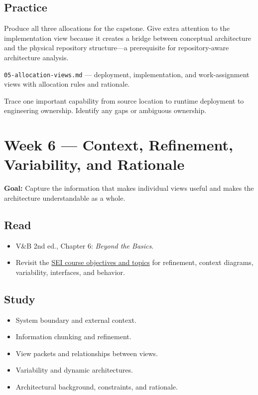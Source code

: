 \documentclass[10pt,letterpaper]{article}
\begin{document}
\subsection{Practice}
Produce all three allocations for the capstone. Give extra attention to the implementation view because it creates a bridge between conceptual architecture and the physical repository structure---a prerequisite for repository-aware architecture analysis.

\begin{deliverablebox}
\texttt{05-allocation-views.md} --- deployment, implementation, and work-assignment views with allocation rules and rationale.
\end{deliverablebox}

\begin{masterybox}
Trace one important capability from source location to runtime deployment to engineering ownership. Identify any gaps or ambiguous ownership.
\end{masterybox}

\section{Week 6 --- Context, Refinement, Variability, and Rationale}

\textbf{Goal:} Capture the information that makes individual views useful and makes the architecture understandable as a whole.

\subsection{Read}
\begin{itemize}
  \item V\&B 2nd ed., Chapter 6: \emph{Beyond the Basics}.
  \item Revisit the \href{https://www.sei.cmu.edu/training/documenting-software-architectures/}{SEI course objectives and topics} for refinement, context diagrams, variability, interfaces, and behavior.
\end{itemize}

\subsection{Study}
\begin{itemize}
  \item System boundary and external context.
  \item Information chunking and refinement.
  \item View packets and relationships between views.
  \item Variability and dynamic architectures.
  \item Architectural background, constraints, and rationale.
\end{itemize}
\end{document}
